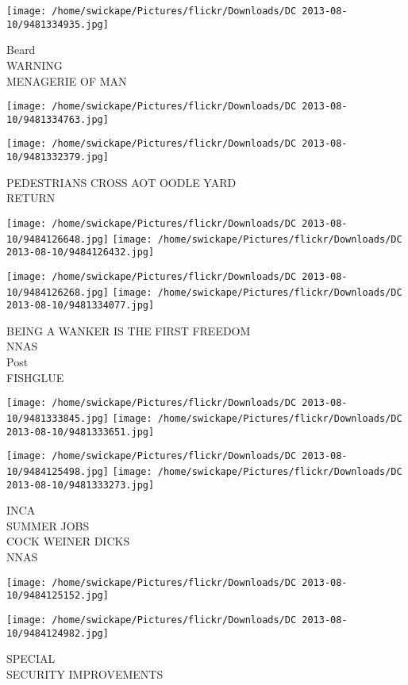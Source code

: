 \documentclass[10pt,letterpaper]{article}
\begin{document}
\texttt{[image: /home/swickape/Pictures/flickr/Downloads/DC 2013-08-10/9481334935.jpg]}

Beard\\
WARNING\\
MENAGERIE OF MAN\\
\pagebreak

\texttt{[image: /home/swickape/Pictures/flickr/Downloads/DC 2013-08-10/9481334763.jpg]}

\vspace{0.25in}
\texttt{[image: /home/swickape/Pictures/flickr/Downloads/DC 2013-08-10/9481332379.jpg]}

PEDESTRIANS CROSS AOT OODLE YARD\\
RETURN\\
\pagebreak

\texttt{[image: /home/swickape/Pictures/flickr/Downloads/DC 2013-08-10/9484126648.jpg]}
\texttt{[image: /home/swickape/Pictures/flickr/Downloads/DC 2013-08-10/9484126432.jpg]}

\texttt{[image: /home/swickape/Pictures/flickr/Downloads/DC 2013-08-10/9484126268.jpg]}
\texttt{[image: /home/swickape/Pictures/flickr/Downloads/DC 2013-08-10/9481334077.jpg]}

BEING A WANKER IS THE FIRST FREEDOM\\
NNAS\\
Post\\
FISHGLUE\\
\pagebreak

\texttt{[image: /home/swickape/Pictures/flickr/Downloads/DC 2013-08-10/9481333845.jpg]}
\texttt{[image: /home/swickape/Pictures/flickr/Downloads/DC 2013-08-10/9481333651.jpg]}

\texttt{[image: /home/swickape/Pictures/flickr/Downloads/DC 2013-08-10/9484125498.jpg]}
\texttt{[image: /home/swickape/Pictures/flickr/Downloads/DC 2013-08-10/9481333273.jpg]}

INCA\\
SUMMER JOBS\\
COCK WEINER DICKS\\
NNAS\\
\pagebreak

\texttt{[image: /home/swickape/Pictures/flickr/Downloads/DC 2013-08-10/9484125152.jpg]}

\vspace{0.25in}
\texttt{[image: /home/swickape/Pictures/flickr/Downloads/DC 2013-08-10/9484124982.jpg]}

SPECIAL\\
SECURITY IMPROVEMENTS\\
\pagebreak
\end{document}
